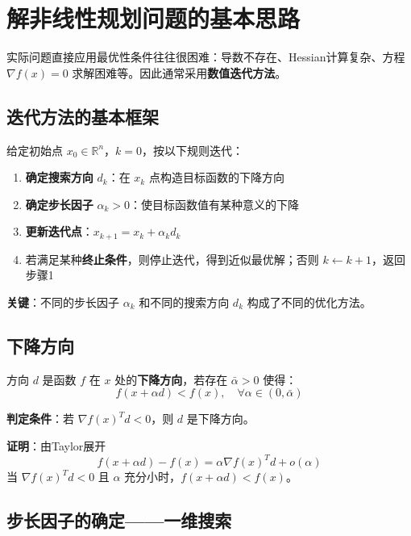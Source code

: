 \section{解非线性规划问题的基本思路}\label{sec:solution-approach}

实际问题直接应用最优性条件往往很困难：导数不存在、Hessian计算复杂、方程 $\nabla f(x) = 0$ 求解困难等。因此通常采用\textbf{数值迭代方法}。

\subsection{迭代方法的基本框架}

\begin{algobox}[最优化方法的基本结构]
给定初始点 $x_0 \in \mathbb{R}^n$，$k = 0$，按以下规则迭代：
\begin{enumerate}[label=\arabic*., leftmargin=2em]
    \item \textbf{确定搜索方向} $d_k$：在 $x_k$ 点构造目标函数的下降方向
    \item \textbf{确定步长因子} $\alpha_k > 0$：使目标函数值有某种意义的下降
    \item \textbf{更新迭代点}：$x_{k+1} = x_k + \alpha_k d_k$
    \item 若满足某种\textbf{终止条件}，则停止迭代，得到近似最优解；否则 $k \leftarrow k+1$，返回步骤1
\end{enumerate}
\end{algobox}

\textbf{关键}：不同的步长因子 $\alpha_k$ 和不同的搜索方向 $d_k$ 构成了不同的优化方法。

\subsection{下降方向}

\begin{definition}[下降方向]
方向 $d$ 是函数 $f$ 在 $x$ 处的\textbf{下降方向}，若存在 $\bar{\alpha} > 0$ 使得：
\[
f(x + \alpha d) < f(x),\quad \forall \alpha \in (0, \bar{\alpha})
\]
\end{definition}

\textbf{判定条件}：若 $\nabla f(x)^T d < 0$，则 $d$ 是下降方向。

\textbf{证明}：由Taylor展开
\[
f(x + \alpha d) - f(x) = \alpha \nabla f(x)^T d + o(\alpha)
\]
当 $\nabla f(x)^T d < 0$ 且 $\alpha$ 充分小时，$f(x + \alpha d) < f(x)$。

\subsection{步长因子的确定——一维搜索}

